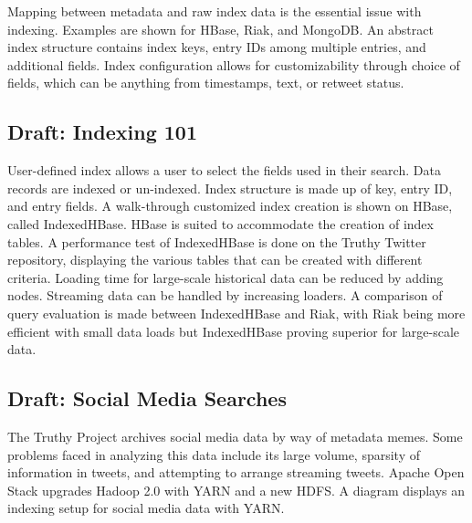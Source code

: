 Mapping between metadata and raw index data is the essential issue with
indexing. Examples are shown for HBase, Riak, and MongoDB. An abstract
index structure contains index keys, entry IDs among multiple entries,
and additional fields. Index configuration allows for customizability
through choice of fields, which can be anything from timestamps, text,
or retweet status.




\subsection{Draft: Indexing 101}

User-defined index allows a user to select the fields used in their
search. Data records are indexed or un-indexed. Index structure is made
up of key, entry ID, and entry fields. A walk-through customized index
creation is shown on HBase, called IndexedHBase. HBase is suited to
accommodate the creation of index tables. A performance test of
IndexedHBase is done on the Truthy Twitter repository, displaying the
various tables that can be created with different criteria. Loading time
for large-scale historical data can be reduced by adding nodes.
Streaming data can be handled by increasing loaders. A comparison of
query evaluation is made between IndexedHBase and Riak, with Riak being
more efficient with small data loads but IndexedHBase proving superior
for large-scale data.




\subsection{Draft: Social Media Searches}

The Truthy Project archives social media data by way of metadata memes.
Some problems faced in analyzing this data include its large volume,
sparsity of information in tweets, and attempting to arrange streaming
tweets. Apache Open Stack upgrades Hadoop 2.0 with YARN and a new HDFS.
A diagram displays an indexing setup for social media data with YARN.

